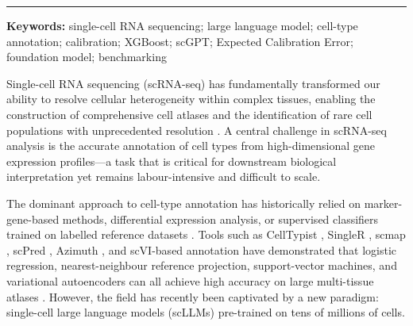 \documentclass[11pt,a4paper]{article}
\makeatletter
\renewcommand\section{\@startsection{section}{1}{\z@}{-3.5ex plus -1ex minus -.2ex}{2.3ex plus .2ex}{\normalfont\large\bfseries}}
\makeatother
\begin{document}
\begin{titlepage}
\begin{center}
\vspace{0.4cm}
\hrule

\vspace{0.6cm}

{\small
\textbf{Keywords:} single-cell RNA sequencing; large language model; cell-type annotation; calibration; XGBoost; scGPT; Expected Calibration Error; foundation model; benchmarking
}

\end{center}
\end{titlepage}

\setcounter{page}{2}
\onehalfspacing

\section{Background}

Single-cell RNA sequencing (scRNA-seq) has fundamentally transformed our ability to resolve cellular heterogeneity within complex tissues, enabling the construction of comprehensive cell atlases and the identification of rare cell populations with unprecedented resolution \citep{Macosko2015, Zheng2017, Tanay2017}. A central challenge in scRNA-seq analysis is the accurate annotation of cell types from high-dimensional gene expression profiles—a task that is critical for downstream biological interpretation yet remains labour-intensive and difficult to scale.

The dominant approach to cell-type annotation has historically relied on marker-gene-based methods, differential expression analysis, or supervised classifiers trained on labelled reference datasets \citep{Aran2019, Kiselev2018, AlquicirayHernandez2019, Hao2021, Abdelaal2019, Pasquini2021}. Tools such as CellTypist \citep{DominguezConde2022}, SingleR \citep{Aran2019}, scmap \citep{Kiselev2018}, scPred \citep{AlquicirayHernandez2019}, Azimuth \citep{Hao2021}, and scVI-based annotation \citep{Lopez2018} have demonstrated that logistic regression, nearest-neighbour reference projection, support-vector machines, and variational autoencoders can all achieve high accuracy on large multi-tissue atlases \citep{Abdelaal2019, Pasquini2021}. However, the field has recently been captivated by a new paradigm: single-cell large language models (scLLMs) pre-trained on tens of millions of cells.
\end{document}
